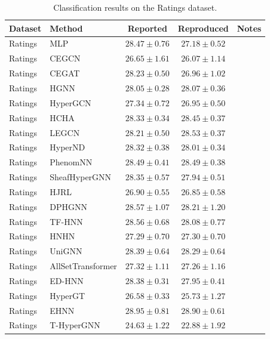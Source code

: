 \vspace{3em}

\begin{table}[H]
    \centering \small
    \renewcommand{\arraystretch}{1.12} 
    \begin{tabular}{llccc}
        \toprule
        Dataset & Method & Reported & Reproduced & Notes \\
        \midrule
        Ratings & MLP & \(28.47 \pm 0.76\) & \(27.18 \pm 0.52\) & \\
        Ratings & CEGCN & \(26.65 \pm 1.61\) & \(26.07 \pm 1.14\) & \\
        Ratings & CEGAT & \(28.23 \pm 0.50\) & \(26.96 \pm 1.02\) & \\
        \grprule
        Ratings & HGNN & \(28.05 \pm 0.28\) & \(28.07 \pm 0.36\) & \\
        Ratings & HyperGCN & \(27.34 \pm 0.72\) & \(26.95 \pm 0.50\) & \\
        Ratings & HCHA & \(28.33 \pm 0.34\) & \(28.45 \pm 0.37\) & \\
        Ratings & LEGCN & \(28.21 \pm 0.50\) & \(28.53 \pm 0.37\) & \\
        Ratings & HyperND & \(28.32 \pm 0.38\) & \(28.01 \pm 0.34\) & \\
        Ratings & PhenomNN & \(28.49 \pm 0.41\) & \(28.49 \pm 0.38\) & \\
        Ratings & SheafHyperGNN & \(28.35 \pm 0.57\) & \(27.94 \pm 0.51\) & \\
        Ratings & HJRL & \(26.90 \pm 0.55\) & \(26.85 \pm 0.58\) & \\
        Ratings & DPHGNN & \(28.57 \pm 1.07\) & \(28.21 \pm 1.20\) & \\
        Ratings & TF-HNN & \(28.56 \pm 0.68\) & \(28.08 \pm 0.77\) & \\
        \grprule
        Ratings & HNHN & \(27.29 \pm 0.70\) & \(27.30 \pm 0.70\) & \\
        Ratings & UniGNN & \(28.39 \pm 0.64\) & \(28.29 \pm 0.64\) & \\
        Ratings & AllSetTransformer & \(27.32 \pm 1.11\) & \(27.26 \pm 1.16\) & \\
        Ratings & ED-HNN & \(28.38 \pm 0.31\) & \(27.95 \pm 0.41\) & \\
        Ratings & HyperGT & \(26.58 \pm 0.33\) & \(25.73 \pm 1.27\) & \\
        \grprule
        Ratings & EHNN & \(28.95 \pm 0.81\) & \(28.90 \pm 0.61\) & \\
        Ratings & T-HyperGNN & \(24.63 \pm 1.22\) & \(22.88 \pm 1.92\) & \\
        \bottomrule
    \end{tabular}
    \caption{Classification results on the Ratings dataset.}


\end{table}
